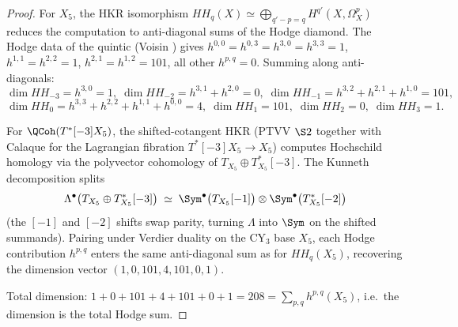\begin{proof}
For $X_5$, the HKR isomorphism \cite{Caldararu2003}
$HH_q(X) \simeq \bigoplus_{q'-p=q} H^{q'}(X,\Omega^p_X)$ reduces the
computation to anti-diagonal sums of the Hodge diamond. The Hodge data
of the quintic (Voisin \cite[Ch.~5]{Voisin2003}) gives
$h^{0,0}=h^{0,3}=h^{3,0}=h^{3,3}=1$, $h^{1,1}=h^{2,2}=1$,
$h^{2,1}=h^{1,2}=101$, all other $h^{p,q}=0$. Summing along
anti-diagonals:
\[
\dim HH_{-3} = h^{3,0} = 1,\;
\dim HH_{-2} = h^{3,1}+h^{2,0} = 0,\;
\dim HH_{-1} = h^{3,2}+h^{2,1}+h^{1,0} = 101,\;
\]
\[
\dim HH_0 = h^{3,3}+h^{2,2}+h^{1,1}+h^{0,0} = 4,\;
\dim HH_1 = 101,\;
\dim HH_2 = 0,\;
\dim HH_3 = 1.
\]

For $\QCoh(T^*[-3]X_5)$, the shifted-cotangent HKR (PTVV \cite{PTVV2013}
$\S 2$ together with Calaque \cite{Calaque2015} for the Lagrangian
fibration $T^*[-3]X_5\to X_5$) computes Hochschild homology via the
polyvector cohomology of $T_{X_5}\oplus T^*_{X_5}[-3]$. The Kunneth
decomposition splits
\[
\Lambda^\bullet\bigl(T_{X_5}\oplus T^*_{X_5}[-3]\bigr)
\;\simeq\;
\Sym^\bullet\bigl(T_{X_5}[-1]\bigr)
\otimes
\Sym^\bullet\bigl(T^*_{X_5}[-2]\bigr)
\]
(the $[-1]$ and $[-2]$ shifts swap parity, turning $\Lambda$ into $\Sym$
on the shifted summands). Pairing under Verdier duality on the CY$_3$
base $X_5$, each Hodge contribution $h^{p,q}$ enters the same
anti-diagonal sum as for $HH_q(X_5)$, recovering the dimension vector
$(1,0,101,4,101,0,1)$.

Total dimension: $1+0+101+4+101+0+1 = 208 = \sum_{p,q} h^{p,q}(X_5)$,
i.e.\ the dimension is the total Hodge sum.
\end{proof}

